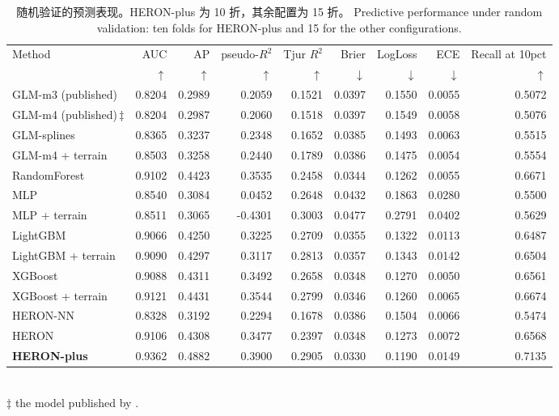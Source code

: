 \begin{table}[htbp]\centering\footnotesize
\caption{\ifzh
随机验证的预测表现。HERON-plus 为 10 折，其余配置为 15 折。
\else
Predictive performance under random validation: ten folds for HERON-plus and 15 for the other configurations.
\fi}\label{tab:bench_random}
\begin{adjustbox}{max width=\linewidth}
\begin{tabular}{lrrrrrrrr}\toprule
Method & AUC & AP & pseudo-$R^2$ & Tjur $R^2$ & Brier & LogLoss & ECE & Recall at 10pct \\
& $\uparrow$ & $\uparrow$ & $\uparrow$ & $\uparrow$ & $\downarrow$ & $\downarrow$ & $\downarrow$ & $\uparrow$ \\ \midrule
GLM-m3 (published) & 0.8204 & 0.2989 & 0.2059 & 0.1521 & 0.0397 & 0.1550 & 0.0055 & 0.5072 \\
GLM-m4 (published)\,$\ddagger$ & 0.8204 & 0.2987 & 0.2060 & 0.1518 & 0.0397 & 0.1549 & 0.0058 & 0.5076 \\
GLM-splines & 0.8365 & 0.3237 & 0.2348 & 0.1652 & 0.0385 & 0.1493 & 0.0063 & 0.5515 \\
GLM-m4 + terrain & 0.8503 & 0.3258 & 0.2440 & 0.1789 & 0.0386 & 0.1475 & 0.0054 & 0.5554 \\
RandomForest & 0.9102 & 0.4423 & 0.3535 & 0.2458 & 0.0344 & 0.1262 & 0.0055 & 0.6671 \\
MLP & 0.8540 & 0.3084 & 0.0452 & 0.2648 & 0.0432 & 0.1863 & 0.0280 & 0.5500 \\
MLP + terrain & 0.8511 & 0.3065 & -0.4301 & 0.3003 & 0.0477 & 0.2791 & 0.0402 & 0.5629 \\
LightGBM & 0.9066 & 0.4250 & 0.3225 & 0.2709 & 0.0355 & 0.1322 & 0.0113 & 0.6487 \\
LightGBM + terrain & 0.9090 & 0.4297 & 0.3117 & 0.2813 & 0.0357 & 0.1343 & 0.0142 & 0.6504 \\
XGBoost & 0.9088 & 0.4311 & 0.3492 & 0.2658 & 0.0348 & 0.1270 & 0.0050 & 0.6561 \\
XGBoost + terrain & 0.9121 & 0.4431 & 0.3544 & 0.2799 & 0.0346 & 0.1260 & 0.0065 & 0.6674 \\
HERON-NN & 0.8328 & 0.3192 & 0.2294 & 0.1678 & 0.0386 & 0.1504 & 0.0066 & 0.5474 \\
HERON & 0.9106 & 0.4308 & 0.3477 & 0.2397 & 0.0348 & 0.1273 & 0.0072 & 0.6568 \\
\textbf{HERON-plus} & 0.9362 & 0.4882 & 0.3900 & 0.2905 & 0.0330 & 0.1190 & 0.0149 & 0.7135 \\
\bottomrule\end{tabular}
\end{adjustbox}
\\[2pt]\footnotesize $\ddagger$ the model published by \cite{ortiz2026}.
\end{table}